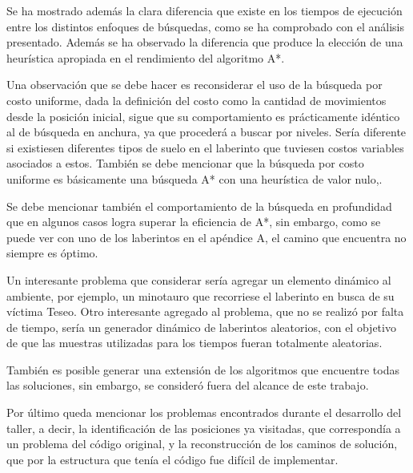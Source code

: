 \documentclass[letter, titlepage, 10pt]{article}
\begin{document}
Se ha mostrado además la clara diferencia que existe en los tiempos de ejecución entre los distintos enfoques de búsquedas, como se ha comprobado con el análisis presentado.  Además se ha observado la diferencia que produce la elección de una heurística apropiada en el rendimiento del algoritmo A*.

Una observación que se debe hacer es reconsiderar el uso de la búsqueda por costo uniforme, dada la definición del costo como la cantidad de movimientos desde la posición inicial, sigue que su comportamiento es prácticamente idéntico al de búsqueda en anchura, ya que procederá a buscar por niveles. Sería diferente si existiesen diferentes tipos de suelo en el laberinto que tuviesen costos variables asociados a estos. También se debe mencionar que la búsqueda por costo uniforme es básicamente una búsqueda A* con una heurística de valor nulo,.

Se debe mencionar también el comportamiento de la búsqueda en profundidad que en algunos casos logra superar la eficiencia de A*, sin embargo, como se puede ver con uno de los laberintos en el apéndice A, el camino que encuentra no siempre es óptimo.

Un interesante problema que considerar sería agregar un elemento dinámico al ambiente, por ejemplo, un minotauro que recorriese el laberinto en busca de su víctima Teseo. Otro interesante agregado al problema, que no se realizó por falta de tiempo, sería un generador dinámico de laberintos aleatorios, con el objetivo de que las muestras utilizadas para los tiempos fueran totalmente aleatorias.

También es posible generar una extensión de los algoritmos que encuentre todas las soluciones, sin embargo, se consideró fuera del alcance de este trabajo. 

Por último queda mencionar los problemas encontrados durante el desarrollo del taller, a decir, la identificación de las posiciones ya visitadas, que correspondía a un problema del código original, y la reconstrucción de los caminos de solución, que por la estructura que tenía el código fue difícil de implementar.


\newpage


\end{document}
